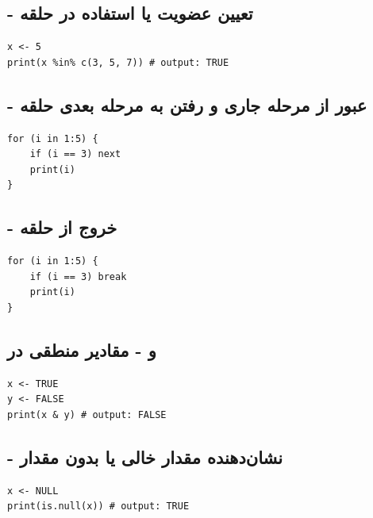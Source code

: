 \documentclass[11pt, a4paper, oneside]{book}
\begin{document}
							
			\subsection{ - تعیین عضویت یا استفاده در حلقه}
				\begin{latin}
					\begin{lstlisting}[caption={\lr{in}}]
x <- 5
print(x %in% c(3, 5, 7)) # output: TRUE
					\end{lstlisting}
				\end{latin}				
				
			\subsection{ - عبور از مرحله جاری و رفتن به مرحله بعدی حلقه}
				\begin{latin}
					\begin{lstlisting}[caption={\lr{next}}]
for (i in 1:5) {
	if (i == 3) next
	print(i)
}
					\end{lstlisting}
				\end{latin}	
				
			\subsection{ - خروج از حلقه}
				\begin{latin}
					\begin{lstlisting}[caption={\lr{break}}]
for (i in 1:5) {
	if (i == 3) break
	print(i)
}
					\end{lstlisting}
				\end{latin}	
	
			\subsection{و  - مقادیر منطقی  در }
				\begin{latin}
					\begin{lstlisting}[caption={\lr{TRUE, FALSE}}]
x <- TRUE
y <- FALSE
print(x & y) # output: FALSE
					\end{lstlisting}
				\end{latin}
				
			\subsection{ - نشان‌دهنده مقدار خالی یا بدون مقدار}
				\begin{latin}
					\begin{lstlisting}[caption={\lr{NULL}}]
x <- NULL
print(is.null(x)) # output: TRUE
					\end{lstlisting}
				\end{latin}
			
\end{document}
